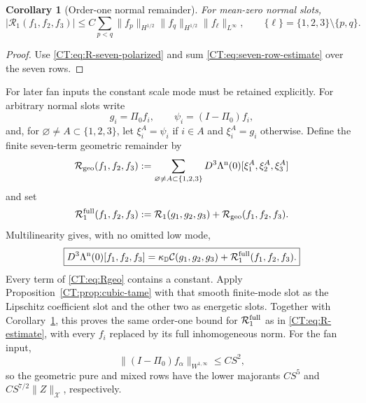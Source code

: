 \documentclass[11pt]{amsart}
\numberwithin{equation}{section}
\newtheorem{corollary}[theorem]{Corollary}
\theoremstyle{definition}
\theoremstyle{remark}
\newcommand{\PiZero}{\Pi_0}
\newcommand{\Cnull}{\mathcal C}
\newcommand{\Rone}{\mathcal R_1}
\newcommand{\Rfull}{\mathcal R_1^{\rm full}}
\newcommand{\Rgeo}{\mathcal R_{\rm geo}}
\newcommand{\X}{\mathcal X}
\begin{document}
\begin{corollary}[Order-one normal remainder]
\label{CT:cor:R-estimate}
For mean-zero normal slots,
\begin{equation}\label{CT:eq:R-estimate}
 |\Rone(f_1,f_2,f_3)|
 \le C\sum_{p<q}\|f_p\|_{H^{1/2}}
                    \|f_q\|_{H^{1/2}}
                    \|f_\ell\|_{L^\infty},
 \qquad \{\ell\}=\{1,2,3\}\setminus\{p,q\}.
\end{equation}
\end{corollary}

\begin{proof}
Use \eqref{CT:eq:R-seven-polarized} and sum
\eqref{CT:eq:seven-row-estimate} over the seven rows.
\end{proof}

For later fan inputs the constant scale mode must be retained explicitly.
For arbitrary normal slots write
\begin{equation*}
 g_i=\PiZero f_i,
 \qquad \psi_i=(I-\PiZero)f_i,
\end{equation*}
and, for $\varnothing\ne A\subset\{1,2,3\}$, let
$\xi_i^A=\psi_i$ if $i\in A$ and $\xi_i^A=g_i$ otherwise.  Define the
finite seven-term geometric remainder by
\begin{equation}\label{CT:eq:Rgeo}
 \Rgeo(f_1,f_2,f_3)
 :=\sum_{\varnothing\ne A\subset\{1,2,3\}}
 D^3\Lambda^{\rm n}(0)
 [\xi_1^A,\xi_2^A,\xi_3^A]
\end{equation}
and set
\begin{equation}\label{CT:eq:Rfull}
 \Rfull(f_1,f_2,f_3)
 :=\Rone(g_1,g_2,g_3)+\Rgeo(f_1,f_2,f_3).
\end{equation}
Multilinearity gives, with no omitted low mode,
\begin{equation}\label{CT:eq:normal-full-split}
 \boxed{
 D^3\Lambda^{\rm n}(0)[f_1,f_2,f_3]
 =\kappa_{\mathbb D}\Cnull(g_1,g_2,g_3)
  +\Rfull(f_1,f_2,f_3).}
\end{equation}
Every term of \eqref{CT:eq:Rgeo} contains a constant.
Apply Proposition~\ref{CT:prop:cubic-tame} with that smooth finite-mode slot
as the Lipschitz coefficient slot and the other two as energetic slots.
Together with Corollary~\ref{CT:cor:R-estimate}, this proves the same
order-one bound for $\Rfull$ as in \eqref{CT:eq:R-estimate}, with every $f_i$
replaced by its full inhomogeneous norm.  For the fan input,
\begin{equation}\label{CT:eq:fan-geometric-size}
 \|(I-\PiZero)f_\alpha\|_{W^{1,\infty}}\le CS^2,
\end{equation}
so the geometric pure and mixed rows have the lower majorants $CS^5$ and
$CS^{7/2}\|Z\|_\X$, respectively.
\end{document}
